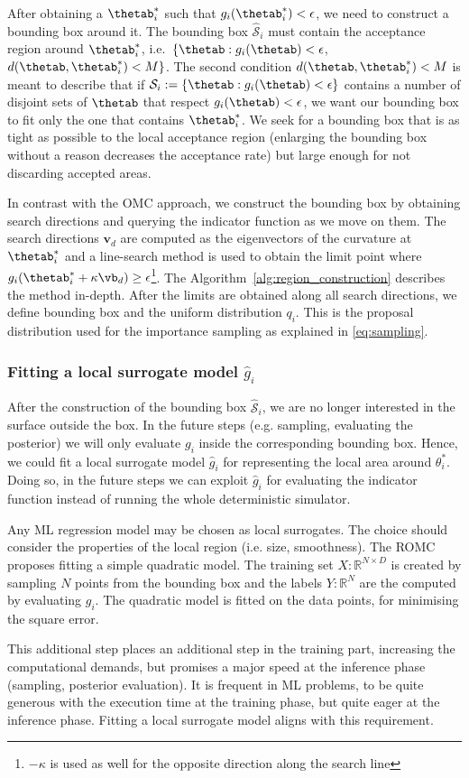 After obtaining a $\thetab_i^*$ such that
$g_i(\thetab_i^*) < \epsilon$, we need to construct a bounding box
around it. The bounding box $\mathcal{\hat{S}}_i$ must contain the
acceptance region around $\thetab_i^*$, i.e.\
$\{ \thetab : g_i(\thetab) < \epsilon$,
$d(\thetab, \thetab_i^*) < M \}$. The second condition
$d(\thetab, \thetab_i^*) < M$ is meant to describe that if
$\mathcal{S}_i := \{ \thetab : g_i(\thetab) < \epsilon \} $ contains a
number of disjoint sets of $\thetab$ that respect
$g_i(\thetab) < \epsilon$, we want our bounding box to fit only the
one that contains $\thetab_i^*$. We seek for a bounding box that is as
tight as possible to the local acceptance region (enlarging the
bounding box without a reason decreases the acceptance rate) but large
enough for not discarding accepted areas.

In contrast with the OMC approach, we construct the bounding box by
obtaining search directions and querying the indicator function as we move on them. The
search directions $\mathbf{v}_d$ are computed as the eigenvectors of
the curvature at $\thetab_i^*$ and a line-search method is used to
obtain the limit point where
$g_i(\thetab_i^* + \kappa \vb_d) \geq
\epsilon$\footnote{$-\kappa$ is used as well for the opposite direction along the search line}. The Algorithm~\ref{alg:region_construction} describes the method in-depth. After the limits are obtained along all
search directions, we define bounding box and the uniform distribution $q_i$. This is the proposal distribution used for the importance
sampling as explained in \eqref{eq:sampling}.


\subsubsection*{Fitting a local surrogate model $\hat{g}_i$}

After the construction of the bounding box $\mathcal{\hat{S}}_i$, we
are no longer interested in the surface outside the box. In the future
steps (e.g. sampling, evaluating the posterior) we will only evaluate
$g_i$ inside the corresponding bounding box. Hence, we could fit a
local surrogate model $\hat{g}_i$ for representing the local area
around $\theta_i^*$. Doing so, in the future steps we can exploit
$\hat{g}_i$ for evaluating the indicator function instead of running
the whole deterministic simulator.

Any ML regression model may be chosen as local surrogates. The choice
should consider the properties of the local region (i.e. size,
smoothness). The ROMC proposes fitting a simple quadratic model. The
training set $X: \mathbb{R}^{N \times D}$ is created by sampling $N$
points from the bounding box and the labels $Y: \mathbb{R}^{N}$ are
the computed by evaluating $g_i$. The quadratic model is fitted on the
data points, for minimising the square error.


This additional step places an
additional step in the training part, increasing the computational
demands, but promises a major speed at the inference phase (sampling,
posterior evaluation). It is frequent in ML problems, to be quite
generous with the execution time at the training phase, but quite
eager at the inference phase. Fitting a local surrogate model aligns
with this requirement.
